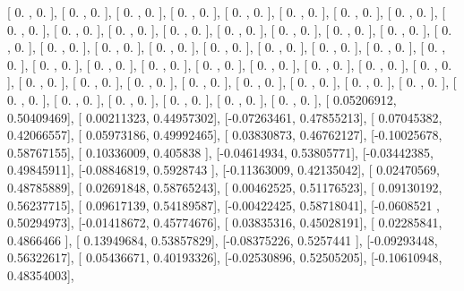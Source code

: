 \documentclass{article}
\begin{document}
       [ 0.        ,  0.        ],
       [ 0.        ,  0.        ],
       [ 0.        ,  0.        ],
       [ 0.        ,  0.        ],
       [ 0.        ,  0.        ],
       [ 0.        ,  0.        ],
       [ 0.        ,  0.        ],
       [ 0.        ,  0.        ],
       [ 0.        ,  0.        ],
       [ 0.        ,  0.        ],
       [ 0.        ,  0.        ],
       [ 0.        ,  0.        ],
       [ 0.        ,  0.        ],
       [ 0.        ,  0.        ],
       [ 0.        ,  0.        ],
       [ 0.        ,  0.        ],
       [ 0.        ,  0.        ],
       [ 0.        ,  0.        ],
       [ 0.        ,  0.        ],
       [ 0.        ,  0.        ],
       [ 0.        ,  0.        ],
       [ 0.        ,  0.        ],
       [ 0.        ,  0.        ],
       [ 0.        ,  0.        ],
       [ 0.        ,  0.        ],
       [ 0.        ,  0.        ],
       [ 0.        ,  0.        ],
       [ 0.        ,  0.        ],
       [ 0.        ,  0.        ],
       [ 0.        ,  0.        ],
       [ 0.        ,  0.        ],
       [ 0.        ,  0.        ],
       [ 0.        ,  0.        ],
       [ 0.        ,  0.        ],
       [ 0.        ,  0.        ],
       [ 0.        ,  0.        ],
       [ 0.        ,  0.        ],
       [ 0.        ,  0.        ],
       [ 0.        ,  0.        ],
       [ 0.        ,  0.        ],
       [ 0.        ,  0.        ],
       [ 0.        ,  0.        ],
       [ 0.        ,  0.        ],
       [ 0.        ,  0.        ],
       [ 0.        ,  0.        ],
       [ 0.        ,  0.        ],
       [ 0.        ,  0.        ],
       [ 0.05206912,  0.50409469],
       [ 0.00211323,  0.44957302],
       [-0.07263461,  0.47855213],
       [ 0.07045382,  0.42066557],
       [ 0.05973186,  0.49992465],
       [ 0.03830873,  0.46762127],
       [-0.10025678,  0.58767155],
       [ 0.10336009,  0.405838  ],
       [-0.04614934,  0.53805771],
       [-0.03442385,  0.49845911],
       [-0.08846819,  0.5928743 ],
       [-0.11363009,  0.42135042],
       [ 0.02470569,  0.48785889],
       [ 0.02691848,  0.58765243],
       [ 0.00462525,  0.51176523],
       [ 0.09130192,  0.56237715],
       [ 0.09617139,  0.54189587],
       [-0.00422425,  0.58718041],
       [-0.0608521 ,  0.50294973],
       [-0.01418672,  0.45774676],
       [ 0.03835316,  0.45028191],
       [ 0.02285841,  0.4866466 ],
       [ 0.13949684,  0.53857829],
       [-0.08375226,  0.5257441 ],
       [-0.09293448,  0.56322617],
       [ 0.05436671,  0.40193326],
       [-0.02530896,  0.52505205],
       [-0.10610948,  0.48354003],
\end{document}
